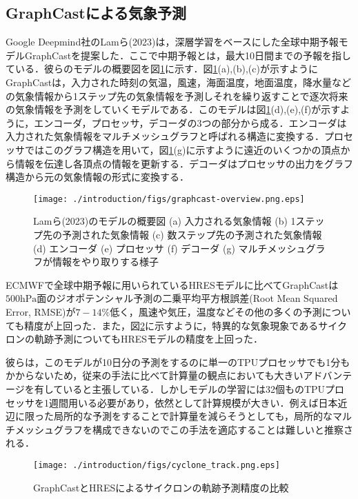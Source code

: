 \subsection{GraphCastによる気象予測 \label{subsec:graphcast}}
Google Deepmind社のLamら(2023)は，深層学習をベースにした全球中期予報モデルGraphCastを提案した\cite{Lam2023}．ここで中期予報とは，最大10日間までの予報を指している．彼らのモデルの概要図を図\ref{fig:graphcast_architecture}に示す．図\ref{fig:graphcast_architecture}(a),(b),(c)が示すようにGraphCastは，入力された時刻の気温，風速，海面温度，地面温度，降水量などの気象情報から1ステップ先の気象情報を予測しそれを繰り返すことで逐次将来の気象情報を予測をしていくモデルである．このモデルは図\ref{fig:graphcast_architecture}(d),(e),(f)が示すように，エンコーダ，プロセッサ，デコーダの3つの部分から成る．エンコーダは入力された気象情報をマルチメッシュグラフと呼ばれる構造に変換する．プロセッサではこのグラフ構造を用いて，図\ref{fig:graphcast_architecture}(g)に示すように遠近のいくつかの頂点から情報を伝達し各頂点の情報を更新する．デコーダはプロセッサの出力をグラフ構造から元の気象情報の形式に変換する．

\begin{figure}[bp]
    \centering
    \texttt{[image: ./introduction/figs/graphcast-overview.png.eps]}
    \caption{Lamら(2023)のモデルの概要図\cite{Lam2023} (a) 入力される気象情報 (b) 1ステップ先の予測された気象情報 (c) 数ステップ先の予測された気象情報 (d) エンコーダ (e) プロセッサ (f) デコーダ (g) マルチメッシュグラフが情報をやり取りする様子}
    \label{fig:graphcast_architecture}
\end{figure}

ECMWFで全球中期予報に用いられているHRESモデル\cite{HRES}に比べてGraphCastは$500\mathrm{hPa}$面のジオポテンシャル\cite{Geopotential}予測の二乗平均平方根誤差(Root Mean Squared Error, RMSE)が$7-14\%$低く，風速や気圧，温度などその他の多くの予測についても精度が上回った．また，図\ref{fig:cyclone_track}に示すように，特異的な気象現象であるサイクロンの軌跡予測についてもHRESモデルの精度を上回った．

彼らは，このモデルが10日分の予測をするのに単一のTPUプロセッサでも1分もかからないため，従来の手法に比べて計算量の観点においても大きいアドバンテージを有していると主張している．しかしモデルの学習には32個ものTPUプロセッサを1週間用いる必要があり，依然として計算規模が大きい．例えば日本近辺に限った局所的な予測をすることで計算量を減らそうとしても，局所的なマルチメッシュグラフを構成できないのでこの手法を適応することは難しいと推察される．

\begin{figure}[bp]
    \centering
    \texttt{[image: ./introduction/figs/cyclone\_track.png.eps]}
    \caption{GraphCastとHRESによるサイクロンの軌跡予測精度の比較\cite{CHEN2021114451}}
    \label{fig:cyclone_track}
\end{figure}

